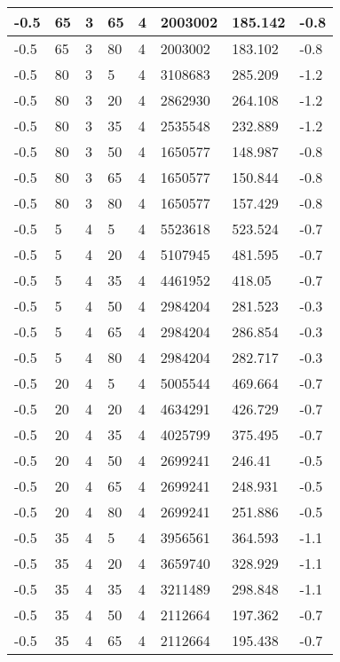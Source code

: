 \begin{longtable}{|p{1.4cm}|p{1.4cm}|p{1.4cm}|p{1.4cm}|p{1.4cm}|p{1.4cm}|p{1.4cm}|p{1.5cm}|}
        -0.5 & 65 & 3 & 65 & 4 & 2003002 & 185.142 & -0.8 \\ \hline
        -0.5 & 65 & 3 & 80 & 4 & 2003002 & 183.102 & -0.8 \\ \hline
        -0.5 & 80 & 3 & 5 & 4 & 3108683 & 285.209 & -1.2 \\ \hline
        -0.5 & 80 & 3 & 20 & 4 & 2862930 & 264.108 & -1.2 \\ \hline
        -0.5 & 80 & 3 & 35 & 4 & 2535548 & 232.889 & -1.2 \\ \hline
        -0.5 & 80 & 3 & 50 & 4 & 1650577 & 148.987 & -0.8 \\ \hline
        -0.5 & 80 & 3 & 65 & 4 & 1650577 & 150.844 & -0.8 \\ \hline
        -0.5 & 80 & 3 & 80 & 4 & 1650577 & 157.429 & -0.8 \\ \hline
        -0.5 & 5 & 4 & 5 & 4 & 5523618 & 523.524 & -0.7 \\ \hline
        -0.5 & 5 & 4 & 20 & 4 & 5107945 & 481.595 & -0.7 \\ \hline
        -0.5 & 5 & 4 & 35 & 4 & 4461952 & 418.05 & -0.7 \\ \hline
        -0.5 & 5 & 4 & 50 & 4 & 2984204 & 281.523 & -0.3 \\ \hline
        -0.5 & 5 & 4 & 65 & 4 & 2984204 & 286.854 & -0.3 \\ \hline
        -0.5 & 5 & 4 & 80 & 4 & 2984204 & 282.717 & -0.3 \\ \hline
        -0.5 & 20 & 4 & 5 & 4 & 5005544 & 469.664 & -0.7 \\ \hline
        -0.5 & 20 & 4 & 20 & 4 & 4634291 & 426.729 & -0.7 \\ \hline
        -0.5 & 20 & 4 & 35 & 4 & 4025799 & 375.495 & -0.7 \\ \hline
        -0.5 & 20 & 4 & 50 & 4 & 2699241 & 246.41 & -0.5 \\ \hline
        -0.5 & 20 & 4 & 65 & 4 & 2699241 & 248.931 & -0.5 \\ \hline
        -0.5 & 20 & 4 & 80 & 4 & 2699241 & 251.886 & -0.5 \\ \hline
        -0.5 & 35 & 4 & 5 & 4 & 3956561 & 364.593 & -1.1 \\ \hline
        -0.5 & 35 & 4 & 20 & 4 & 3659740 & 328.929 & -1.1 \\ \hline
        -0.5 & 35 & 4 & 35 & 4 & 3211489 & 298.848 & -1.1 \\ \hline
        -0.5 & 35 & 4 & 50 & 4 & 2112664 & 197.362 & -0.7 \\ \hline
        -0.5 & 35 & 4 & 65 & 4 & 2112664 & 195.438 & -0.7 \\ \hline

\end{longtable}
